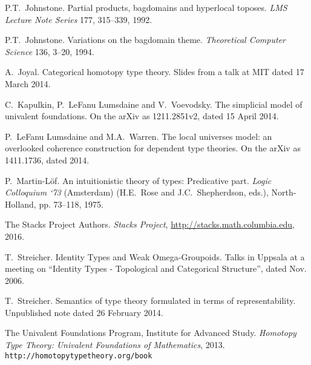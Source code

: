 \documentclass[12pt]{article}
\theoremstyle{definition}
\begin{document}
\begin{thebibliography}{300}
P.T.~Johnstone. Partial products, bagdomains and hyperlocal toposes.
\emph{LMS Lecture Note Series} 177, 315--339, 1992.

 P.T.~Johnstone.  Variations on the bagdomain theme.  \emph{Theoretical Computer Science} 136, 3--20, 1994.

 A.~Joyal. Categorical homotopy type theory.  Slides from a talk at MIT dated 17 March 2014.

C.~Kapulkin, P.~LeFanu Lumsdaine and V.~Voevodsky. The simplicial model of univalent foundations. On the arXiv as 1211.2851v2, dated 15 April 2014.

P.~LeFanu Lumsdaine and  M.A.~Warren.  The local universes model: an overlooked coherence construction for dependent type theories.  On the arXiv as 1411.1736, dated 2014.

 P.~Martin-L\"of.  An intuitionistic theory of types: Predicative part. \emph{Logic Colloquium `73} (Amsterdam) (H.E.~Rose and J.C.~Shepherdson, eds.), North-Holland, pp. 73--118, 1975.

 The {Stacks Project Authors}. {\itshape Stacks Project}, {\url{http://stacks.math.columbia.edu}}, {2016}.

 T.~Streicher. Identity Types and Weak Omega-Groupoids. Talks in Uppsala at a meeting on ``Identity Types - Topological and Categorical Structure'', dated Nov. 2006.

 T.~Streicher.
Semantics of type theory formulated in terms of representability. Unpublished note dated 26 February 2014.

The Univalent Foundations Program, Institute for Advanced Study. \emph{Homotopy Type Theory: Univalent Foundations of Mathematics}, 2013. {\tt http://homotopytypetheory.org/book}

%
\end{thebibliography}

\end{document}
